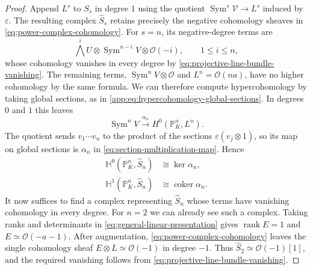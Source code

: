 \documentclass[12pt,reqno,a4paper]{amsart}
\numberwithin{equation}{section}
\numberwithin{figure}{section}
\theoremstyle{plain}
\theoremstyle{definition}
\begin{document}
\begin{proof}
Append $L^s$ to $S_s$ in degree $1$ using the quotient
$\operatorname{Sym}^s\mathcal V\to L^s$ induced by $\varepsilon$.
The resulting complex $\widehat S_s$ retains precisely the negative
cohomology sheaves in \eqref{eq:power-complex-cohomology}.
For $s=n$, its negative-degree terms are
\[
 \bigwedge^iU\otimes\operatorname{Sym}^{n-i}V
                         \otimes\mathcal O(-i),
             \qquad 1\leq i\leq n,
\]
whose cohomology vanishes in every degree by
\eqref{eq:projective-line-bundle-vanishing}. The remaining terms,
$\operatorname{Sym}^nV\otimes\mathcal O$ and $L^n=\mathcal O(na)$,
have no higher cohomology by the same formula. We can therefore
compute hypercohomology by taking global sections, as in
\eqref{app:eq:hypercohomology-global-sections}. In degrees $0$ and $1$
this leaves
\[
 \operatorname{Sym}^nV\xrightarrow{\alpha_n}
                  H^0(\mathbb P^n_K,L^n).
\]
The quotient sends $v_1\cdots v_n$ to
the product of the sections $\varepsilon(v_j\otimes1)$, so its map on
global sections is $\alpha_n$ in \eqref{eq:section-multiplication-map}. Hence
\begin{equation}\label{eq:section-multiplication-kernel-cokernel}
 \begin{aligned}
 \mathbb H^0(\mathbb P^n_K,\widehat S_n)&\cong\ker\alpha_n,\\
 \mathbb H^1(\mathbb P^n_K,\widehat S_n)&\cong\operatorname{coker}\alpha_n.
 \end{aligned}
\end{equation}
It now suffices to find a complex representing $\widehat S_n$ whose
terms have vanishing cohomology in every degree. For $n=2$ we can
already see such a complex. Taking ranks and determinants in
\eqref{eq:general-linear-presentation} gives
$\operatorname{rank}E=1$ and $E\simeq\mathcal O(-a-1)$.
After augmentation, \eqref{eq:power-complex-cohomology} leaves the
single cohomology sheaf $E\otimes L\simeq\mathcal O(-1)$ in degree
$-1$. Thus $\widehat S_2\simeq\mathcal O(-1)[1]$, and the required
vanishing follows from \eqref{eq:projective-line-bundle-vanishing}.


\end{proof}
\end{document}
